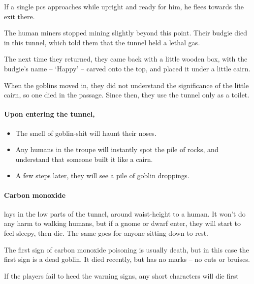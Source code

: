 \begin{multicols}{2}

If a single \glspl{pc} approaches while upright and ready for him, he flees towards the exit there.


\begin{exampletext}
  The human miners stopped mining slightly beyond this point.
  Their budgie died in this tunnel, which told them that the tunnel held a lethal gas.

  The next time they returned, they came back with a little wooden box, with the budgie's name -- `Happy' -- carved onto the top, and placed it under a little cairn.

  When the goblins moved in, they did not understand the significance of the little cairn, so one died in the passage.
  Since then, they use the tunnel only as a toilet.
\end{exampletext}

\paragraph{Upon entering the tunnel,}

\begin{itemize}
  \item
  The smell of goblin-shit will haunt their noses.
  \item
  Any humans in the troupe will instantly spot the pile of rocks, and understand that someone built it like a cairn.
  \item
  A few \glspl{step} later, they will see a pile of goblin droppings.
\end{itemize}

\paragraph{Carbon monoxide}
lays in the low parts of the tunnel, around waist-height to a human.
It won't do any harm to walking humans, but if a gnome or dwarf enter, they will start to feel sleepy, then die.
The same goes for anyone sitting down to rest.

The first sign of carbon monoxide poisoning is usually death, but in this case the first sign is a dead goblin.
It died recently, but has no marks -- no cuts or bruises.

If the players fail to heed the warning signs, any short characters will die first


\end{multicols}
